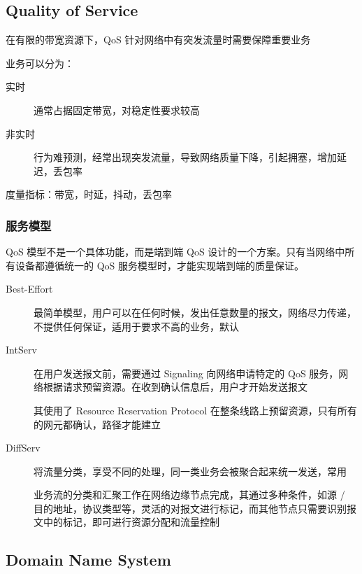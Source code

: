 \documentclass[11pt,journal,compsoc]{IEEEtran}
\begin{document}
\subsection{Quality of Service}

在有限的带宽资源下，QoS 针对网络中有突发流量时需要保障重要业务

业务可以分为：

\begin{description}
    \item[实时] 通常占据固定带宽，对稳定性要求较高

    \item[非实时] 行为难预测，经常出现突发流量，导致网络质量下降，引起拥塞，增加延迟，丢包率
\end{description}

度量指标：带宽，时延，抖动，丢包率


\subsubsection{服务模型}

QoS 模型不是一个具体功能，而是端到端 QoS 设计的一个方案。只有当网络中所有设备都遵循统一的 QoS 服务模型时，才能实现端到端的质量保证。

\begin{description}
    \item[Best-Effort] 最简单模型，用户可以在任何时候，发出任意数量的报文，网络尽力传递，不提供任何保证，适用于要求不高的业务，默认

    \item[IntServ] 在用户发送报文前，需要通过 Signaling 向网络申请特定的 QoS 服务，网络根据请求预留资源。在收到确认信息后，用户才开始发送报文

    其使用了 Resource Reservation Protocol 在整条线路上预留资源，只有所有的网元都确认，路径才能建立

    \item[DiffServ] 将流量分类，享受不同的处理，同一类业务会被聚合起来统一发送，常用

    业务流的分类和汇聚工作在网络边缘节点完成，其通过多种条件，如源 / 目的地址，协议类型等，灵活的对报文进行标记，而其他节点只需要识别报文中的标记，即可进行资源分配和流量控制
\end{description}


\subsection{Domain Name System}
\end{document}
